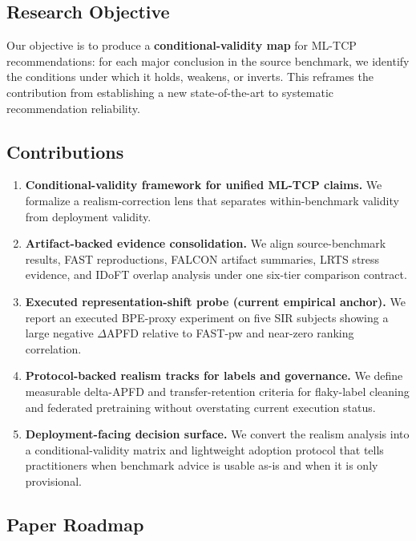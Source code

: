 \documentclass[10pt,conference]{IEEEtran}
\begin{document}
\subsection{Research Objective}\label{subsec:objective}

Our objective is to produce a \textbf{conditional-validity map} for ML-TCP recommendations: for each major conclusion in the source benchmark, we identify the conditions under which it holds, weakens, or inverts. This reframes the contribution from establishing a new state-of-the-art to systematic recommendation reliability.

\subsection{Contributions}\label{subsec:contributions}

\begin{enumerate}[leftmargin=*]
\item \textbf{Conditional-validity framework for unified ML-TCP claims.} We formalize a realism-correction lens that separates within-benchmark validity from deployment validity.
\item \textbf{Artifact-backed evidence consolidation.} We align source-benchmark results, FAST reproductions, FALCON artifact summaries, LRTS stress evidence, and IDoFT overlap analysis under one six-tier comparison contract.
\item \textbf{Executed representation-shift probe (current empirical anchor).} We report an executed BPE-proxy experiment on five SIR subjects showing a large negative $\Delta$APFD relative to FAST-pw and near-zero ranking correlation.
\item \textbf{Protocol-backed realism tracks for labels and governance.} We define measurable delta-APFD and transfer-retention criteria for flaky-label cleaning and federated pretraining without overstating current execution status.
\item \textbf{Deployment-facing decision surface.} We convert the realism analysis into a conditional-validity matrix and lightweight adoption protocol that tells practitioners when benchmark advice is usable as-is and when it is only provisional.
\end{enumerate}

\subsection{Paper Roadmap}\label{subsec:roadmap}
\end{document}
